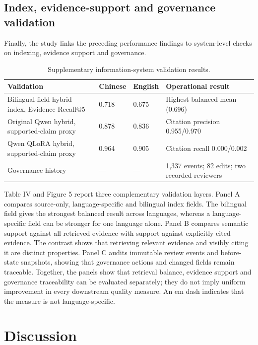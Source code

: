 \subsection{Index, evidence-support and governance validation}

Finally, the study links the preceding performance findings to system-level checks on indexing, evidence support and governance.

\begin{table}[ht]
\centering
\caption{Supplementary information-system validation results.}

\begin{tabular}{llll}
\toprule
Validation & Chinese & English & Operational result \\
\midrule
Bilingual-field hybrid index, Evidence Recall@5 & 0.718 & 0.675 & Highest balanced mean (0.696) \\
Original Qwen hybrid, supported-claim proxy & 0.878 & 0.836 & Citation precision 0.955/0.970 \\
Qwen QLoRA hybrid, supported-claim proxy & 0.964 & 0.905 & Citation recall 0.000/0.002 \\
Governance history & — & — & 1,337 events; 82 edits; two recorded reviewers \\
\bottomrule
\end{tabular}
\end{table}

Table IV and Figure 5 report three complementary validation layers. Panel A compares source-only, language-specific and bilingual index fields. The bilingual field gives the strongest balanced result across languages, whereas a language-specific field can be stronger for one language alone. Panel B compares semantic support against all retrieved evidence with support against explicitly cited evidence. The contrast shows that retrieving relevant evidence and visibly citing it are distinct properties. Panel C audits immutable review events and before-state snapshots, showing that governance actions and changed fields remain traceable. Together, the panels show that retrieval balance, evidence support and governance traceability can be evaluated separately; they do not imply uniform improvement in every downstream quality measure. An em dash indicates that the measure is not language-specific.

\clearpage

\section{Discussion}

